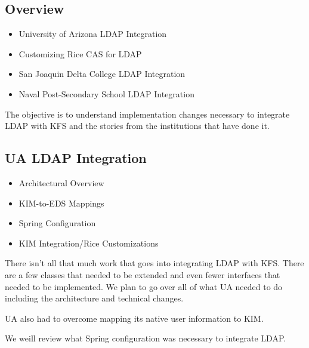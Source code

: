 \documentclass[12pt,notitlepage]{article}
\author{David Elyea, Anthony Potts, and Leo Przybylski}
\begin{document}
  \W \begin{s5presentation}
  \maketitle
  \W \begin{s5slide}
    \W \section{Overview}
    \begin{itemize}
      \item University of Arizona LDAP Integration
      \item Customizing Rice CAS for LDAP
      \item San Joaquin Delta College LDAP Integration
      \item Naval Post-Secondary School LDAP Integration 
    \end{itemize}
    \W \begin{s5notes}
      The objective is to understand implementation changes necessary to integrate LDAP with KFS and
      the stories from the institutions that have done it.
      \W \end{s5notes}
    \W \end {s5slide}
  \W \begin{s5slide}
    \W \section{UA LDAP Integration}
    \begin{itemize}
      \item Architectural Overview
      \item KIM-to-EDS Mappings
      \item Spring Configuration
      \item KIM Integration/Rice Customizations
    \end{itemize}
    \W \begin{s5notes}
      There isn't all that much work that goes into integrating LDAP with KFS. There are a few classes
      that needed to be extended and even fewer interfaces that needed to be implemented. We plan to go
      over all of what UA needed to do including the architecture and technical changes.

      UA also had to overcome mapping its native user information to KIM.

      We weill review what Spring configuration was necessary to integrate LDAP.


\end{s5notes}
\end{s5slide}
\end{s5presentation}
\end{document}
